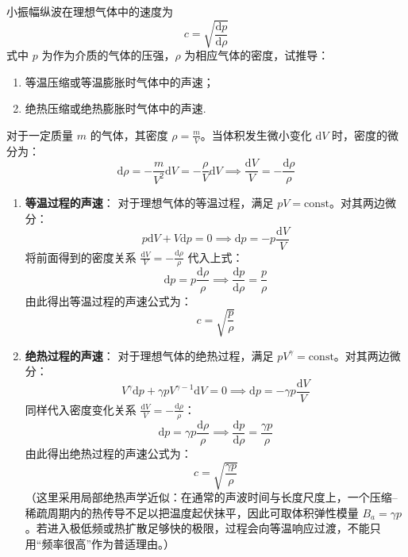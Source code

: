 \begin{exercise}\label{ex:11.6}
小振幅纵波在理想气体中的速度为
$$ c = \sqrt{\frac{\mathrm{d}p}{\mathrm{d}\rho}} $$
式中 $p$ 为作为介质的气体的压强，$\rho$ 为相应气体的密度，试推导：
\begin{enumerate}
  \item[(a)] 等温压缩或等温膨胀时气体中的声速；
  \item[(b)] 绝热压缩或绝热膨胀时气体中的声速.
\end{enumerate}
\end{exercise}
\begin{solution}
对于一定质量 $m$ 的气体，其密度 $\rho = \frac{m}{V}$。当体积发生微小变化 $\mathrm{d}V$ 时，密度的微分为：
$$ \mathrm{d}\rho = -\frac{m}{V^2} \mathrm{d}V = -\frac{\rho}{V} \mathrm{d}V \implies \frac{\mathrm{d}V}{V} = - \frac{\mathrm{d}\rho}{\rho} $$

\begin{enumerate}
    \item[(a)] \textbf{等温过程的声速}：
    对于理想气体的等温过程，满足 $pV = \mathrm{const}$。对其两边微分：
    $$ p\mathrm{d}V + V\mathrm{d}p = 0 \implies \mathrm{d}p = -p \frac{\mathrm{d}V}{V} $$
    将前面得到的密度关系 $\frac{\mathrm{d}V}{V} = - \frac{\mathrm{d}\rho}{\rho}$ 代入上式：
    $$ \mathrm{d}p = p \frac{\mathrm{d}\rho}{\rho} \implies \frac{\mathrm{d}p}{\mathrm{d}\rho} = \frac{p}{\rho} $$
    由此得出等温过程的声速公式为：
    $$ c = \sqrt{\frac{p}{\rho}} $$

    \item[(b)] \textbf{绝热过程的声速}：
    对于理想气体的绝热过程，满足 $p V^\gamma = \mathrm{const}$。对其两边微分：
    $$ V^\gamma \mathrm{d}p + \gamma p V^{\gamma-1} \mathrm{d}V = 0 \implies \mathrm{d}p = - \gamma p \frac{\mathrm{d}V}{V} $$
    同样代入密度变化关系 $\frac{\mathrm{d}V}{V} = - \frac{\mathrm{d}\rho}{\rho}$：
    $$ \mathrm{d}p = \gamma p \frac{\mathrm{d}\rho}{\rho} \implies \frac{\mathrm{d}p}{\mathrm{d}\rho} = \frac{\gamma p}{\rho} $$
    由此得出绝热过程的声速公式为：
    $$ c = \sqrt{\frac{\gamma p}{\rho}} $$
    （这里采用局部绝热声学近似：在通常的声波时间与长度尺度上，一个压缩--稀疏周期内的热传导不足以把温度起伏抹平，因此可取体积弹性模量 $B_a=\gamma p$。若进入极低频或热扩散足够快的极限，过程会向等温响应过渡，不能只用“频率很高”作为普适理由。）
\end{enumerate}
\end{solution}

